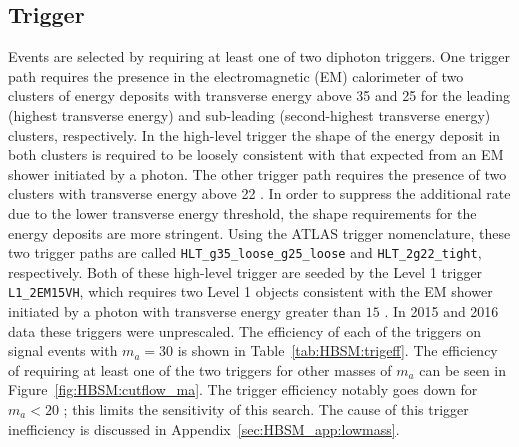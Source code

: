 \subsection{Trigger}
\label{sec:HBSM:trigger}
Events are selected by requiring at least one of two diphoton triggers.
One trigger path requires the presence in the electromagnetic (EM) calorimeter of two clusters of energy
deposits with transverse energy
above 35 \GeV{} and 25 \GeV{} for the leading (highest transverse energy) and sub-leading
(second-highest transverse energy) clusters, respectively.
In the high-level trigger the shape of the energy deposit in both clusters is required to be loosely consistent with that expected from an EM shower initiated by a photon.
The other trigger path requires the presence of two clusters with transverse energy above 22 \GeV{}.
In order to suppress the additional rate due to the lower transverse energy threshold, the shape requirements for the energy deposits are
more stringent.
Using the ATLAS trigger nomenclature, these two trigger paths are called \texttt{HLT\_g35\_loose\_g25\_loose} and \texttt{HLT\_2g22\_tight}, respectively.
Both of these high-level trigger are seeded by the Level 1 trigger \texttt{L1\_2EM15VH}, which requires two Level 1 objects consistent with the EM shower initiated by a photon with transverse energy greater than $15$ \GeV{}.
In 2015 and 2016 data these triggers were unprescaled.
The efficiency of each of the triggers on signal events with $m_a=30$ \GeV{} is shown in Table~\ref{tab:HBSM:trigeff}.
The efficiency of requiring at least one of the two triggers for other masses of $m_a$ can be seen in Figure~\ref{fig:HBSM:cutflow_ma}.
The trigger efficiency notably goes down for $m_a<20$ \GeV{}; this limits the sensitivity of this search.
The cause of this trigger inefficiency is discussed in Appendix~\ref{sec:HBSM_app:lowmass}.

